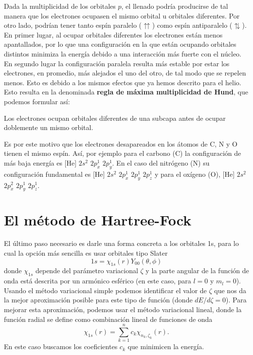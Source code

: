 \documentclass{tufte-handout}
\begin{document}
Dada la multiplicidad de los orbitales $p$, el llenado podría
producirse de tal manera que los electrones ocupasen
 el mismo orbital u orbitales diferentes. Por otro lado,
 podrían tener tanto espín paralelo ($\upuparrows$) como espín 
 antiparalelo  ($\updownarrows$). En primer lugar, al ocupar orbitales diferentes los electrones están menos apantallados, por lo que 
 una configuración en la que están ocupando orbitales distintos
 minimiza la energía debido a una interacción más fuerte con el núcleo. En segundo lugar la configuración paralela resulta más estable por estar los electrones, en promedio, más alejados el uno del otro, de tal modo que se repelen menos. 
 Esto es debido a los mismos efectos que ya hemos descrito para el helio. Esto resulta en la denominada \textbf{regla de máxima multiplicidad de Hund}, que podemos formular así:
 \begin{displayquote}
Los electrones ocupan orbitales diferentes de una subcapa antes 
de ocupar doblemente un mismo orbital.
\end{displayquote}

Es por este motivo que los electrones desapareados en los átomos de C, N y O tienen el mismo espín.
Así, por ejemplo para el carbono (C) la configuración de más baja energía 
es [He] $2s^2$ $2p_x^1$ $2p_y^1$. 
En el caso del nitrógeno (N) su configuración fundamental es [He] $2s^2$ $2p_x^1$ $2p_y^1$ $2p_z^1$ y para el oxígeno (O), [He] $2s^2$ 
$2p_x^2$ $2p_y^1$ $2p_z^1$.

\section{El método de Hartree-Fock}
El último paso necesario es darle una forma concreta a los
orbitales 1s, para lo cual la opción más sencilla
es usar orbitales tipo Slater
\begin{equation}
    1s=\chi_{1s}(r)Y_{00}(\theta, \phi)
\end{equation}
donde $\chi_{1s}$ depende del parámetro variacional 
$\zeta$ y la parte angular de la función de onda está
descrita por un armónico esférico (en este caso, 
para $l=0$ y $m_l=0$). Usando el método variacional 
simple podemos identificar el valor de $\zeta$ 
que nos da la mejor aproximación posible para este tipo
de función (donde $dE/d\zeta=0$).
Para mejorar esta aproximación, podemos usar el método
variacional lineal, donde la función radial 
se define como combinación lineal de funciones de onda
\begin{equation}
    \chi_{1s}(r)=\sum_{k=1}^nc_k\chi_{n_k,\zeta_k}(r).
\end{equation}
En este caso buscamos los coeficientes $c_k$ que minimicen
la energía. 
\end{document}
